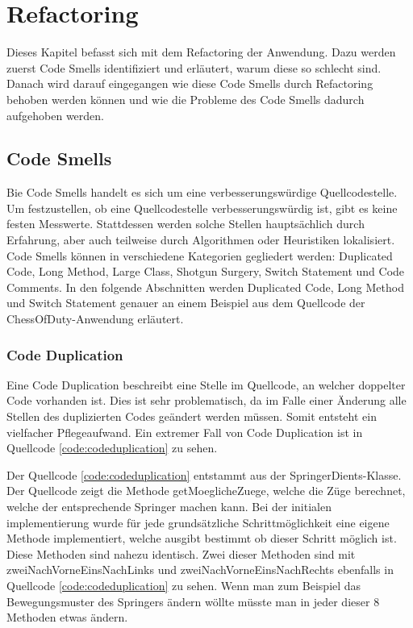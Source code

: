 \chapter{Refactoring}
Dieses Kapitel befasst sich mit dem Refactoring der Anwendung. Dazu werden zuerst Code Smells identifiziert und erläutert, warum diese so schlecht sind. Danach wird darauf eingegangen wie diese Code Smells durch Refactoring behoben werden können und wie die Probleme des Code Smells dadurch aufgehoben werden.

\section{Code Smells}
Bie Code Smells handelt es sich um eine verbesserungswürdige Quellcodestelle. Um festzustellen, ob eine Quellcodestelle verbesserungswürdig ist, gibt es keine festen Messwerte. Stattdessen werden solche Stellen hauptsächlich durch Erfahrung, aber auch teilweise durch Algorithmen oder Heuristiken lokalisiert. Code Smells können in verschiedene Kategorien gegliedert werden: Duplicated Code, Long Method, Large Class, Shotgun Surgery, Switch Statement und Code Comments. In den folgende Abschnitten werden Duplicated Code, Long Method und Switch Statement genauer an einem Beispiel aus dem Quellcode der ChessOfDuty-Anwendung erläutert.

\subsection{Code Duplication}
Eine Code Duplication beschreibt eine Stelle im Quellcode, an welcher doppelter Code vorhanden ist. Dies ist sehr problematisch, da im Falle einer Änderung alle Stellen des duplizierten Codes geändert werden müssen. Somit entsteht ein vielfacher Pflegeaufwand. Ein extremer Fall von Code Duplication ist in Quellcode \ref{code:codeduplication} zu sehen.  


Der Quellcode \ref{code:codeduplication} entstammt aus der SpringerDients-Klasse. Der Quellcode zeigt die Methode getMoeglicheZuege, welche die Züge berechnet, welche der entsprechende Springer machen kann. Bei der initialen implementierung wurde für jede grundsätzliche Schrittmöglichkeit eine eigene Methode implementiert, welche ausgibt bestimmt ob dieser Schritt möglich ist. Diese Methoden sind nahezu identisch. Zwei dieser Methoden sind mit zweiNachVorneEinsNachLinks und zweiNachVorneEinsNachRechts ebenfalls in Quellcode \ref{code:codeduplication} zu sehen. Wenn man zum Beispiel das Bewegungsmuster des Springers ändern wöllte müsste man in jeder dieser 8 Methoden etwas ändern. 



